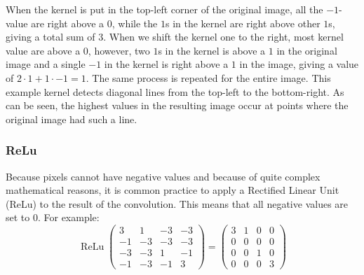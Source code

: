 \documentclass[12pt, titlepage]{article}
\begin{document}
    When the kernel is put in the top-left corner of the original image, all the $-1$-value are right above a $0$, while the $1$s in the kernel are right above other $1$s, giving a total sum of $3$. When we shift the kernel one to the right, most kernel value are above a $0$, however, two $1$s in the kernel is above a $1$ in the original image and a single $-1$ in the kernel is right above a $1$ in the image, giving a value of $2\cdot 1+1\cdot -1=1$. The same process is repeated for the entire image. This example kernel detects diagonal lines from the top-left to the bottom-right. As can be seen, the highest values in the resulting image occur at points where the original image had such a line. 
    
    \subsubsection{ReLu}
    Because pixels cannot have negative values and because of quite complex mathematical reasons, it is common practice to apply a Rectified Linear Unit (ReLu) to the result of the convolution. This means that all negative values are set to $0$. For example:
    \begin{equation*}
    \operatorname{ReLu}\begin{pmatrix}
    3 &1 &-3 &-3\\
    -1 & -3 & -3 &-3\\
    -3 &-3 &1 &-1\\
    -1 &-3 &-1 &3
    \end{pmatrix} = \begin{pmatrix}
    3 &1 &0 &0\\
    0 & 0 & 0 &0\\
    0 &0 &1 &0\\
    0 &0 &0 &3
    \end{pmatrix}
    \end{equation*}
    
\end{document}
